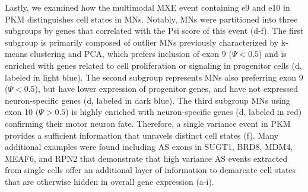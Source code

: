 \clearpage


Lastly, we examined how the multimodal MXE event containing e9 and e10 in PKM distinguishes cell states in MNs. Notably, MNs were partitioned into three subgroups by genes that correlated with the Psi score of this event (d-f). The first subgroup is primarily composed of outlier MNs previously characterized by k-means clustering and PCA, which prefers inclusion of exon 9 ($\Psi < 0.5$) and is enriched with genes related to cell proliferation or signaling in progenitor cells (d, labeled in light blue). The second subgroup represents MNs also preferring exon 9 ($\Psi < 0.5$), but have lower expression of progenitor genes, and have not expressed neuron-specific genes (d, labeled in dark blue). The third subgroup MNs using exon 10 ($\Psi > 0.5$) is highly enriched with neuron-specific genes (d, labeled in red) confirming their motor neuron fate. Therefore, a single variance event in PKM provides a sufficient information that unravels distinct cell states (f). Many additional examples were found including AS exons in SUGT1, BRD8, MDM4, MEAF6, and RPN2 that demonstrate that high variance AS events extracted from single cells offer an additional layer of information to demarcate cell states that are otherwise hidden in overall gene expression (a-i).


